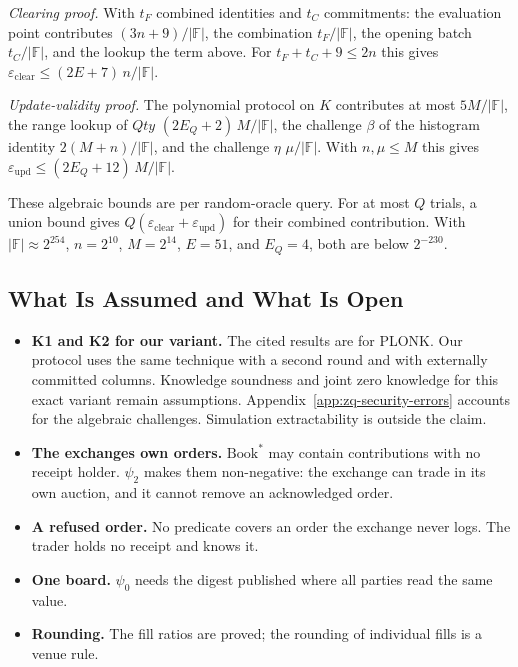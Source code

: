 \emph{Clearing proof.} With \(t_F\) combined identities and \(t_C\) commitments: the evaluation point contributes \((3n+9)/|\mathbb{F}|\), the combination \(t_F/|\mathbb{F}|\), the opening batch \(t_C/|\mathbb{F}|\), and the lookup the term above. For \(t_F + t_C + 9 \le 2n\) this gives \(\varepsilon_{\mathrm{clear}} \le (2E+7)\,n/|\mathbb{F}|\).

\emph{Update-validity proof.} The polynomial protocol on \(K\) contributes at most \(5M/|\mathbb{F}|\), the range lookup of \(Qty\) \((2E_Q+2)\,M/|\mathbb{F}|\), the challenge \(\beta\) of the histogram identity \(2(M+n)/|\mathbb{F}|\), and the challenge \(\eta\) \(\mu/|\mathbb{F}|\). With \(n, \mu \le M\) this gives \(\varepsilon_{\mathrm{upd}} \le (2E_Q+12)\,M/|\mathbb{F}|\).

These algebraic bounds are per random-oracle query. For at most \(Q\) trials, a union bound gives \(Q(\varepsilon_{\mathrm{clear}}+\varepsilon_{\mathrm{upd}})\) for their combined contribution. With \(|\mathbb{F}| \approx 2^{254}\), \(n = 2^{10}\), \(M = 2^{14}\), \(E = 51\), and \(E_Q = 4\), both are below \(2^{-230}\).

\subsection{What Is Assumed and What Is Open}
\label{app:zq-security-limits}

\begin{itemize}
\item
  \textbf{K1 and K2 for our variant.} The cited results are for PLONK. Our protocol uses the same technique with a second round and with externally committed columns. Knowledge soundness and joint zero knowledge for this exact variant remain assumptions. Appendix~\ref{app:zq-security-errors} accounts for the algebraic challenges. Simulation extractability is outside the claim.
\item
  \textbf{The exchange\textquotesingle s own orders.} \(\text{Book}^*\) may contain contributions with no receipt holder. \(\psi_2\) makes them non-negative: the exchange can trade in its own auction, and it cannot remove an acknowledged order.
\item
  \textbf{A refused order.} No predicate covers an order the exchange never logs. The trader holds no receipt and knows it.
\item
  \textbf{One board.} \(\psi_0\) needs the digest published where all parties read the same value.
\item
  \textbf{Rounding.} The fill ratios are proved; the rounding of individual fills is a venue rule.
\end{itemize}

